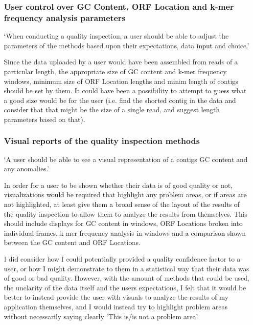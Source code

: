 \subsubsection{User control over GC Content, ORF Location and k-mer frequency analysis parameters}
`When conducting a quality inspection, a user should be able to adjust the parameters of the methods based upon their expectations, data input and choice.'

Since the data uploaded by a user would have been assembled from reads of a particular length, the appropriate size of GC content and k-mer frequency windows, minimum size of ORF Location lengths and minim length of contigs should be set by them. It could have been a possibility to attempt to guess what a good size would be for the user (i.e. find the shorted contig in the data and consider that that might be the size of a single read, and suggest length parameters based on that).

\subsubsection{Visual reports of the quality inspection methods}
`A user should be able to see a visual representation of a contigs GC content and any anomalies.'

In order for a user to be shown whether their data is of good quality or not, visualizations would be required that highlight any problem areas, or if areas are not highlighted, at least give them a broad sense of the layout of the results of the quality inspection to allow them to analyze the results from themselves. This should include displays for GC content in windows, ORF Locations broken into individual frames, k-mer frequency analysis in windows and a comparison shown between the GC content and ORF Locations.

I did consider how I could potentially provided a quality confidence factor to a user, or how I might demonstrate to them in a statistical way that their data was of good or bad quality. However, with the amount of methods that could be used, the unclarity of the data itself and the users expectations, I felt that it would be better to instead provide the user with visuals to analyze the results of my application themselves, and I would instead try to highlight problem areas without necessarily saying clearly `This is/is not a problem area'.

